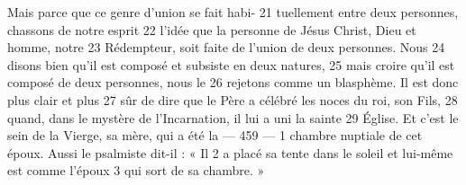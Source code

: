Mais parce que ce genre d'union se fait habi-	 
21	 	tuellement entre deux personnes, chassons de notre esprit	 
22	 	l'idée que la personne de Jésus Christ, Dieu et homme, notre	 
23	 	Rédempteur, soit faite de l'union de deux personnes. Nous	 
24	 	disons bien qu'il est composé et subsiste en deux natures,	 
25	 	mais croire qu'il est composé de deux personnes, nous le	 
26	 	rejetons comme un blasphème. Il est donc plus clair et plus	 
27	 	sûr de dire que le Père a célébré les noces du roi, son Fils,	 
28	 	quand, dans le mystère de l'Incarnation, il lui a uni la sainte	 
29	 	Église. Et c'est le sein de la Vierge, sa mère, qui a été la	 
 	--- 459 ---	 
1	 	chambre nuptiale de cet époux. Aussi le psalmiste dit-il : « Il	 
2	 	a placé sa tente dans le soleil et lui-même est comme l'époux	 
3	 	qui sort de sa chambre. »